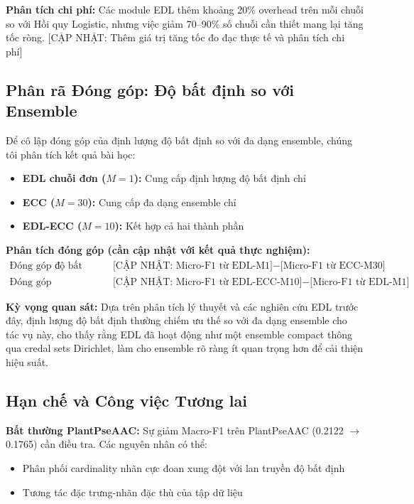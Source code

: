 \documentclass[conference]{IEEEtran}
\begin{document}
\textbf{Phân tích chi phí:} Các module EDL thêm khoảng 20\% overhead trên mỗi chuỗi so với Hồi quy Logistic, nhưng việc giảm 70--90\% số chuỗi cần thiết mang lại tăng tốc ròng. [CẬP NHẬT: Thêm giá trị tăng tốc đo đạc thực tế và phân tích chi phí]

\subsection{Phân rã Đóng góp: Độ bất định so với Ensemble}

Để cô lập đóng góp của định lượng độ bất định so với đa dạng ensemble, chúng tôi phân tích kết quả bài học:

\begin{itemize}
    \item \textbf{EDL chuỗi đơn ($M=1$):} Cung cấp định lượng độ bất định chỉ
    \item \textbf{ECC ($M=30$):} Cung cấp đa dạng ensemble chỉ
    \item \textbf{EDL-ECC ($M=10$):} Kết hợp cả hai thành phần
\end{itemize}

\textbf{Phân tích đóng góp (cần cập nhật với kết quả thực nghiệm):}
\begin{align}
\text{Đóng góp độ bất định:} &\quad \text{[CẬP NHẬT: Micro-F1 từ EDL-M1]} - \text{[Micro-F1 từ ECC-M30]} \\
\text{Đóng góp ensemble:} &\quad \text{[CẬP NHẬT: Micro-F1 từ EDL-ECC-M10]} - \text{[Micro-F1 từ EDL-M1]}
\end{align}

\textbf{Kỳ vọng quan sát:} Dựa trên phân tích lý thuyết và các nghiên cứu EDL trước đây, định lượng độ bất định thường chiếm ưu thế so với đa dạng ensemble cho tác vụ này, cho thấy rằng EDL đã hoạt động như một ensemble compact thông qua credal sets Dirichlet, làm cho ensemble rõ ràng ít quan trọng hơn để cải thiện hiệu suất.

\subsection{Hạn chế và Công việc Tương lai}

\textbf{Bất thường PlantPseAAC:} Sự giảm Macro-F1 trên PlantPseAAC (0.2122 $\to$ 0.1765) cần điều tra. Các nguyên nhân có thể:
\begin{itemize}
    \item Phân phối cardinality nhãn cực đoan xung đột với lan truyền độ bất định
    \item Tương tác đặc trưng-nhãn đặc thù của tập dữ liệu
\end{itemize}
\end{document}
